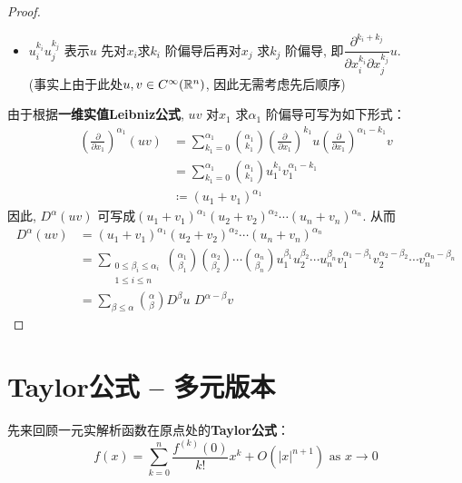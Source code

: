 \begin{thm}
\begin{proof}
\begin{itemize}
				\item $u_{i}^{k_i} u_{j}^{k_j}$ 表示$u$ 先对$x_i $求$k_i$ 阶偏导后再对$x_j$ 求$k_j$ 阶偏导, 即$\dfrac{\partial^{k_i + k_j}}{\partial x_{i}^{k_i} \partial x_{j}^{k_j}} u$. \\
				(事实上由于此处$u , v \in C^{\infty}(\mathbb{R}^n)$, 因此无需考虑先后顺序)
			\end{itemize}
			由于根据\textbf{一维实值Leibniz公式}, $uv$ 对$x_1$ 求$\alpha_1$ 阶偏导可写为如下形式：
			\begin{align}
				\left( \frac{\partial}{\partial x_1} \right)^{\alpha_1} (uv) 
				&= \sum_{k_1 = 0}^{\alpha_1} {\alpha_1 \choose k_1} \left( \frac{\partial}{\partial x_1} \right)^{k_1} u \left( \frac{\partial}{\partial x_1} \right)^{\alpha_1 - k_1} v \\
				&= \sum_{k_1 = 0}^{\alpha_1} {\alpha_1 \choose k_1} u_{1}^{k_1} v_{1}^{\alpha_1 - k_1} \\
				&\coloneqq (u_1 + v_1)^{\alpha_1}
			\end{align}
			因此, $D^{\alpha}(uv)$ 可写成$(u_1 + v_1)^{\alpha_1} (u_2 + v_2)^{\alpha_2} \cdots (u_n + v_n)^{\alpha_n}$. 从而
			\begin{align}
				D^{\alpha}(uv) 
				&= (u_1 + v_1)^{\alpha_1} (u_2 + v_2)^{\alpha_2} \cdots (u_n + v_n)^{\alpha_n} \\
				&= \sum_{\substack{0 \leq \beta_i \leq \alpha_i \\ 1 \leq i \leq n}} 
				{\alpha_1 \choose \beta_1} {\alpha_2 \choose \beta_2} \cdots {\alpha_n \choose \beta_n} 
				u_{1}^{\beta_1} u_{2}^{\beta_2} \cdots u_{n}^{\beta_n} v_{1}^{\alpha_1 - \beta_1} v_{2}^{\alpha_2 - \beta_2} \cdots v_{n}^{\alpha_n - \beta_n} \\
				&= \sum_{\beta \leq \alpha} {\alpha \choose \beta} D^{\beta}u \,\, D^{\alpha - \beta}v
			\end{align}
		\end{proof}
	\end{thm}

\newpage

\section{Taylor公式 -- 多元版本}
	先来回顾一元实解析函数在原点处的\textbf{Taylor公式}：
	\[ f(x) = \sum_{k = 0}^{n} \frac{f^{(k)}(0)}{k !} x^k + O(\left| x \right|^{n + 1}) \,\, \text{as} \,\, x \to 0 \]
	
	\vspace{6em}	
	
